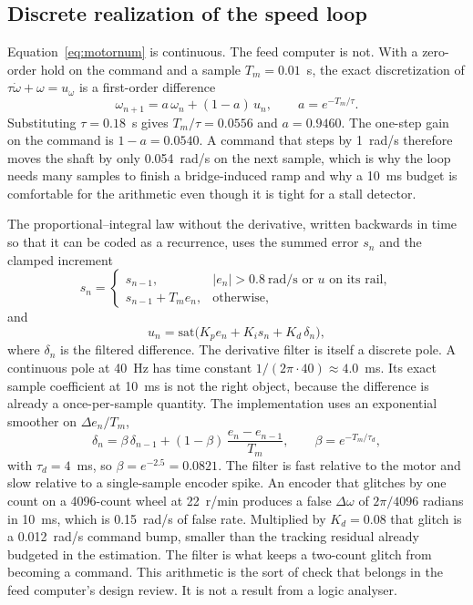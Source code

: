 \subsection{Discrete realization of the speed loop}
\label{sec:discrete}

Equation~\eqref{eq:motornum} is continuous. The feed computer is not. With a zero-order hold on the command and a sample $T_m=0.01$~s, the exact discretization of $\tau\dot\omega+\omega=u_{\omega}$ is a first-order difference
\begin{equation}
\omega_{n+1} = a\,\omega_n + (1-a)\,u_n, \qquad a = e^{-T_m/\tau}.
\label{eq:discplant}
\end{equation}
Substituting $\tau=0.18$~s gives $T_m/\tau=0.0556$ and $a=0.9460$. The one-step gain on the command is $1-a=0.0540$. A command that steps by 1~rad/s therefore moves the shaft by only 0.054~rad/s on the next sample, which is why the loop needs many samples to finish a bridge-induced ramp and why a 10~ms budget is comfortable for the arithmetic even though it is tight for a stall detector.

The proportional--integral law without the derivative, written backwards in time so that it can be coded as a recurrence, uses the summed error $s_n$ and the clamped increment
\begin{equation}
s_n =
\begin{cases}
s_{n-1}, & |e_n|>0.8~\text{rad/s or } u \text{ on its rail},\\
s_{n-1}+T_m e_n, & \text{otherwise},
\end{cases}
\label{eq:sum}
\end{equation}
and
\begin{equation}
u_n = \mathrm{sat}\big(K_p e_n + K_i s_n + K_d\,\delta_n\big),
\label{eq:usat}
\end{equation}
where $\delta_n$ is the filtered difference. The derivative filter is itself a discrete pole. A continuous pole at 40~Hz has time constant $1/(2\pi\cdot 40)\approx 4.0$~ms. Its exact sample coefficient at 10~ms is not the right object, because the difference is already a once-per-sample quantity. The implementation uses an exponential smoother on $\Delta e_n/T_m$,
\begin{equation}
\delta_n = \beta\,\delta_{n-1} + (1-\beta)\,\frac{e_n-e_{n-1}}{T_m}, \qquad \beta = e^{-T_m/\tau_d},
\label{eq:dfilt}
\end{equation}
with $\tau_d=4$~ms, so $\beta=e^{-2.5}=0.0821$. The filter is fast relative to the motor and slow relative to a single-sample encoder spike. An encoder that glitches by one count on a 4096-count wheel at 22~r/min produces a false $\Delta\omega$ of $2\pi/4096$ radians in 10~ms, which is 0.15~rad/s of false rate. Multiplied by $K_d=0.08$ that glitch is a 0.012~rad/s command bump, smaller than the tracking residual already budgeted in the estimation. The filter is what keeps a two-count glitch from becoming a command. This arithmetic is the sort of check that belongs in the feed computer's design review. It is not a result from a logic analyser.

